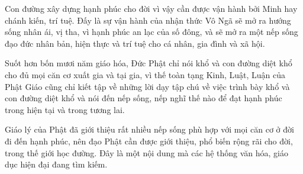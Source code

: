 Con đường xây dựng hạnh phúc cho đời vì vậy cần được vận hành bởi Minh hay chánh kiến, trí tuệ. Đấy là sự vận hành của nhận thức Vô Ngã sẽ mở ra hướng sống nhân ái, vị tha, vì hạnh phúc an lạc của số đông, và sẽ mở ra một nếp sống đạo đức nhân bản, hiện thực và trí tuệ cho cá nhân, gia đình và xã hội.

Suốt hơn bốn mươi năm giáo hóa, Đức Phật chỉ nói khổ và con đường diệt khổ cho đủ mọi căn cơ xuất gia và tại gia, vì thế toàn tạng Kinh, Luật, Luận của Phật Giáo cũng chỉ kiết tập về những lời dạy tập chú về việc trình bày khổ và con đường diệt khổ và nói đến nếp sống, nếp nghĩ thế nào để đạt hạnh phúc trong hiện tại và trong tương lai.

Giáo lý của Phật đã giới thiệu rất nhiều nếp sống phù hợp với mọi căn cơ ở đời đi đến hạnh phúc, nên đạo Phật cần được giới thiệu, phổ biến rộng rãi cho đời, trong thế giới học đường. Đây là một nội dung mà các hệ thống văn hóa, giáo dục hiện đại đang tìm kiếm.


